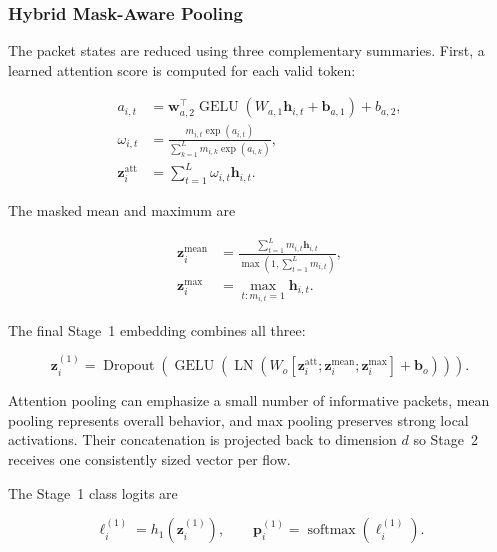 \subsubsection{Hybrid Mask-Aware Pooling}
\label{subsubsec:hybrid_pooling}

The packet states are reduced using three complementary summaries. First, a
learned attention score is computed for each valid token:

\begin{align}
    a_{i,t}
    &=\mathbf{w}_{a,2}^{\top}
      \operatorname{GELU}
      \left(W_{a,1}\mathbf{h}_{i,t}+\mathbf{b}_{a,1}\right)+b_{a,2},\\
    \omega_{i,t}
    &=\frac{m_{i,t}\exp(a_{i,t})}
      {\sum_{k=1}^{L}m_{i,k}\exp(a_{i,k})},\\
    \mathbf{z}^{\mathrm{att}}_i
    &=\sum_{t=1}^{L}\omega_{i,t}\mathbf{h}_{i,t}.
    \label{eq:stage1_attention_pooling}
\end{align}

The masked mean and maximum are

\begin{align}
    \mathbf{z}^{\mathrm{mean}}_i
    &=\frac{\sum_{t=1}^{L}m_{i,t}\mathbf{h}_{i,t}}
            {\max(1,\sum_{t=1}^{L}m_{i,t})},\\
    \mathbf{z}^{\mathrm{max}}_i
    &=\max_{t:m_{i,t}=1}\mathbf{h}_{i,t}.
    \label{eq:mean_max_pooling}
\end{align}

The final Stage~1 embedding combines all three:

\begin{equation}
    \mathbf{z}^{(1)}_i
    =\operatorname{Dropout}
      \left(
        \operatorname{GELU}
        \left(
          \operatorname{LN}
          \left(
            W_o
            [\mathbf{z}^{\mathrm{att}}_i;
             \mathbf{z}^{\mathrm{mean}}_i;
             \mathbf{z}^{\mathrm{max}}_i]
            +\mathbf{b}_o
          \right)
        \right)
      \right).
    \label{eq:hybrid_pooling}
\end{equation}

Attention pooling can emphasize a small number of informative packets, mean
pooling represents overall behavior, and max pooling preserves strong local
activations. Their concatenation is projected back to dimension $d$ so Stage~2
receives one consistently sized vector per flow.

The Stage~1 class logits are

\begin{equation}
    \boldsymbol{\ell}^{(1)}_i
    =h_1(\mathbf{z}^{(1)}_i),
    \qquad
    \mathbf{p}^{(1)}_i
    =\operatorname{softmax}(\boldsymbol{\ell}^{(1)}_i).
    \label{eq:stage1_classifier}
\end{equation}

